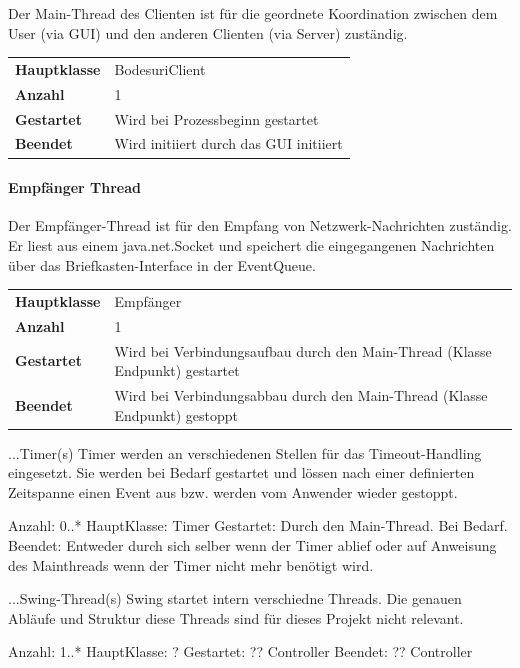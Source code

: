 \documentclass[12pt,halfparskip]{scrartcl}
\begin{document}
Der Main-Thread des Clienten ist für die geordnete Koordination zwischen dem User (via GUI) und den anderen Clienten (via Server) zuständig.

\begin{tabular}{@{} l p{12.5cm}}
\textbf{Hauptklasse}  & BodesuriClient \\
\textbf{Anzahl}       & 1 \\
\textbf{Gestartet}    & Wird bei Prozessbeginn gestartet \\
\textbf{Beendet}      & Wird initiiert durch das GUI initiiert
\end{tabular}


\paragraph{Empfänger Thread} %
\label{ssub:empfänger_thread}

Der Empfänger-Thread ist für den Empfang von Netzwerk-Nachrichten zuständig. Er liest aus einem java.net.Socket und speichert die eingegangenen Nachrichten über das Briefkasten-Interface in der EventQueue.

\begin{tabular}{@{} l p{12.5cm}}
\textbf{Hauptklasse}  & Empfänger \\
\textbf{Anzahl}       & 1 \\
\textbf{Gestartet}    & Wird bei Verbindungsaufbau durch den Main-Thread (Klasse Endpunkt) gestartet \\
\textbf{Beendet}      & Wird bei Verbindungsabbau durch den Main-Thread (Klasse Endpunkt) gestoppt
\end{tabular}



...Timer(s)
Timer werden an verschiedenen Stellen für das Timeout-Handling eingesetzt. Sie werden bei Bedarf gestartet und lössen nach einer definierten Zeitspanne einen Event aus bzw. werden vom Anwender wieder gestoppt.

Anzahl: 0..*
HauptKlasse: Timer
Gestartet: Durch den Main-Thread. Bei Bedarf.
Beendet: Entweder durch sich selber wenn der Timer ablief oder auf Anweisung des Mainthreads wenn der Timer nicht mehr benötigt wird. 


...Swing-Thread(s)
Swing startet intern verschiedne Threads. Die genauen Abläufe und Struktur diese Threads sind für dieses Projekt nicht relevant.

Anzahl: 1..*
HauptKlasse: ?
Gestartet: ?? Controller
Beendet: ?? Controller
\end{document}
